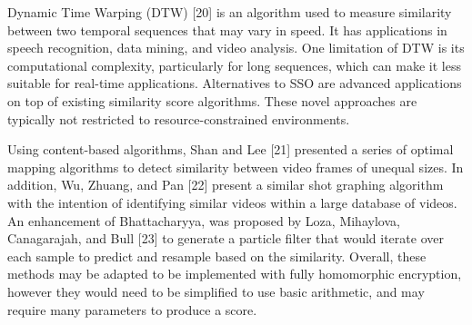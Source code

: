 

Dynamic Time Warping (DTW) [20] is an algorithm used to measure similarity between two temporal sequences that may vary in speed. It has applications in speech recognition, data mining, and video analysis. One limitation of DTW is its computational complexity, particularly for long sequences, which can make it less suitable for real-time applications. 
Alternatives to SSO are advanced applications on top of existing similarity score algorithms. These novel approaches are typically not restricted to resource-constrained environments.




Using content-based algorithms, Shan and Lee [21] presented a series of optimal mapping algorithms to detect similarity between video frames of unequal sizes. In addition, Wu, Zhuang, and Pan [22] present a similar shot graphing algorithm with the intention of identifying similar videos within a large database of videos. An enhancement of Bhattacharyya, was proposed by Loza, Mihaylova, Canagarajah, and Bull [23] to generate a particle filter that would iterate over each sample to predict and resample based on the similarity. Overall, these methods may be adapted to be implemented with fully homomorphic encryption, however they would need to be simplified to use basic arithmetic, and may require many parameters to produce a score.
